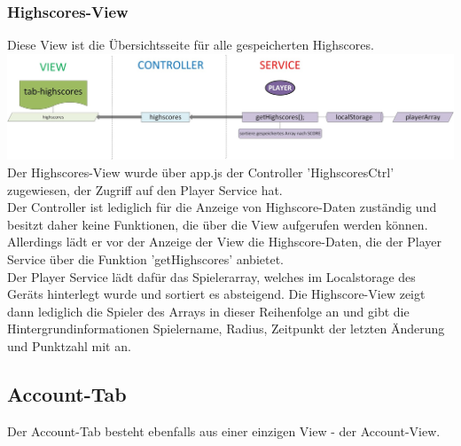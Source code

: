 \subsubsection{Highscores-View}
%
%
Diese View ist die Übersichtsseite für alle gespeicherten Highscores.
%
%
\\ \includegraphics[width=1\textwidth]{ref/images/06-highscores-tab.png} \\
%
%
Der Highscores-View wurde über app.js der Controller 'HighscoresCtrl' zugewiesen, der Zugriff auf den Player Service hat.
\\
Der Controller ist lediglich für die Anzeige von Highscore-Daten zuständig und besitzt daher keine Funktionen, die über die View aufgerufen werden können. Allerdings lädt er vor der Anzeige der View die Highscore-Daten, die der Player Service über die Funktion 'getHighscores' anbietet.
\\
Der Player Service lädt dafür das Spielerarray, welches im Localstorage des Geräts hinterlegt wurde und sortiert es absteigend. Die Highscore-View zeigt dann lediglich die Spieler des Arrays in dieser Reihenfolge an und gibt die Hintergrundinformationen Spielername, Radius, Zeitpunkt der letzten Änderung und Punktzahl mit an.
\subsection{Account-Tab}
Der Account-Tab besteht ebenfalls aus einer einzigen View - der Account-View.
